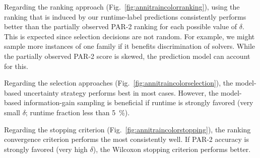 \documentclass[runningheads]{llncs}
\begin{document}
Regarding the ranking approach (Fig.~\ref{fig:annitraincolorranking}), using the ranking that is induced by our runtime-label predictions consistently performs better than the partially observed PAR-2 ranking for each possible value of $\delta$.
This is expected since selection decisions are not random.
For example, we might sample more instances of one family if it benefits discrimination of solvers.
While the partially observed PAR-2 score is skewed, the prediction model can account for this.

Regarding the selection approaches (Fig.~\ref{fig:annitraincolorselection}), the model-based uncertainty strategy performs best in most cases.
However, the model-based information-gain sampling is beneficial if runtime is strongly favored (very small $\delta$; runtime fraction less than \SI{5}{\%}).

Regarding the stopping criterion (Fig.~\ref{fig:annitraincolorstopping}), the ranking convergence criterion performs the most consistently well.
If PAR-2 accuracy is strongly favored (very high $\delta$), the Wilcoxon stopping criterion performs better.
\end{document}
